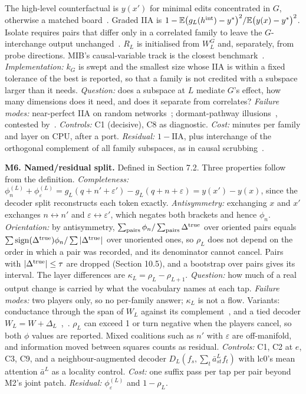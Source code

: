 \documentclass[conference]{IEEEtran}
\begin{document}
The high-level counterfactual is $y(x')$ for minimal edits concentrated in $G$, otherwise a matched board~\cite{gat2024}. Graded IIA is $1-\mathbb E\big(g_L(h^{\rm int})-y^*\big)^2/\mathbb E\big(y(x)-y^*\big)^2$. Isolate requires pairs that differ only in a correlated family to leave the $G$-interchange output unchanged~\cite{huang2024}. $R_L$ is initialised from $W^G_L$ and, separately, from probe directions. MIB's causal-variable track is the closest benchmark~\cite{mueller2025}. \emph{Implementation:} $k_G$ is swept and the smallest size whose IIA is within a fixed tolerance of the best is reported, so that a family is not credited with a subspace larger than it needs. \emph{Question:} does a subspace at $L$ mediate $G$'s effect, how many dimensions does it need, and does it separate from correlates? \emph{Failure modes:} near-perfect IIA on random networks~\cite{sutter2025}; dormant-pathway illusions~\cite{makelov2024}, contested by~\cite{wu2024}. \emph{Controls:} C1 (decisive), C8 as diagnostic. \emph{Cost:} minutes per family and layer on CPU, after a port. \emph{Residual:} $1-\mathrm{IIA}$, plus interchange of the orthogonal complement of all family subspaces, as in causal scrubbing~\cite{chan2022}.

\textbf{M6. Named/\allowbreak{}residual split.} Defined in Section 7.2. Three properties follow from the definition. \emph{Completeness:} $\phi^{(L)}_n+\phi^{(L)}_\varepsilon=g_L(q+n'+\varepsilon')-g_L(q+n+\varepsilon)=y(x')-y(x)$, since the decoder split reconstructs each token exactly. \emph{Antisymmetry:} exchanging $x$ and $x'$ exchanges $n\leftrightarrow n'$ and $\varepsilon\leftrightarrow\varepsilon'$, which negates both brackets and hence $\phi_n$. \emph{Orientation:} by antisymmetry, $\sum_{\rm pairs}\phi_n/\sum_{\rm pairs}\Delta^{\rm true}$ over oriented pairs equals $\sum\mathrm{sign}(\Delta^{\rm true})\phi_n/\sum|\Delta^{\rm true}|$ over unoriented ones, so $\rho_L$ does not depend on the order in which a pair was recorded, and its denominator cannot cancel. Pairs with $|\Delta^{\rm true}|\le\tau$ are dropped (Section 10.5), and a bootstrap over pairs gives its interval. The layer differences are $\kappa_L=\rho_L-\rho_{L+1}$. \emph{Question:} how much of a real output change is carried by what the vocabulary names at each tap. \emph{Failure modes:} two players only, so no per-family answer; $\kappa_L$ is not a flow. Variants: conductance through the span of $W_L$ against its complement~\cite{dhamdhere2019}, and a tied decoder $W_L=W+\Delta_L$~\cite{lindsey2024},~\cite{lawson2025}. $\rho_L$ can exceed 1 or turn negative when the players cancel, so both $\phi$ values are reported. Mixed coalitions such as $n'$ with $\varepsilon$ are off-manifold, and information moved between squares counts as residual. \emph{Controls:} C1, C2 at $e$, C3, C9, and a neighbour-augmented decoder $D_L(f_s,\sum_t\bar a^L_{st}f_t)$ with lc0's mean attention $\bar a^L$ as a locality control. \emph{Cost:} one suffix pass per tap per pair beyond M2's joint patch. \emph{Residual:} $\phi^{(L)}_\varepsilon$ and $1-\rho_L$.
\end{document}
